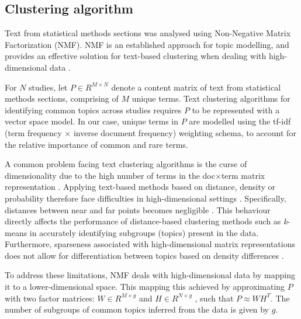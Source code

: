 \documentclass[12pt]{article}
\begin{document}
\subsection{Clustering algorithm}

Text from statistical methods sections was analysed using Non-Negative
Matrix Factorization (NMF). NMF is an established approach for topic
modelling, and provides an effective solution for text-based clustering
when dealing with high-dimensional data
\citep[\citet{luong2019clustering}]{kim2014algorithms}.

For \(N\) studies, let \(P \in R^{M \times N}\) denote a content matrix of text from statistical methods sections, comprising of \(M\) unique
terms. Text clustering algorithms for identifying common topics across
studies requires \(P\) to be represented with a vector space model. In
our case, unique terms in \(P\) are modelled using the tf-idf (term
frequency \(\times\) inverse document frequency) weighting schema, to
account for the relative importance of common and rare terms.

A common problem facing text clustering algorithms is the curse of
dimensionality due to the high number of terms in the doc\(\times\)term
matrix representation
\citep[\citet{sutanto2018fine}]{aggarwal2012mining}. Applying text-based
methods based on distance, density or probability therefore face
difficulties in high-dimensional settings
\citep[\citet{mohotti2018corpus},\citet{mohotti2019concept}]{park2018examining}.
Specifically, distances between near and far points becomes negligible
\citep{aggarwal2012mining}. This behaviour directly affects the
performance of distance-based clustering methods such as
\textit{k}-means \citep{jain2010} in accurately identifying subgroups
(topics) present in the data. Furthermore, sparseness associated with
high-dimensional matrix representations does not allow for
differentiation between topics based on density differences
\citep[\citet{mohotti2018efficient}]{mohotti2018corpus}.

To address these limitations, NMF deals with high-dimensional data by
mapping it to a lower-dimensional space. This mapping this achieved by
approximating \(P\) with two factor matrices: \(W \in R^{M \times g}\)
and \(H \in R ^{N \times g}\) \citep{aggarwal2012mining}, such that
\(P \approx WH^{T}\). The number of subgroups of common topics inferred
from the data is given by \(g\).
\end{document}
